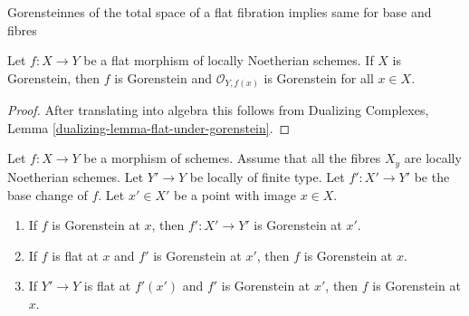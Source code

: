 \begin{lemma}
\label{lemma-flat-morphism-from-gorenstein-scheme}
\begin{slogan}
Gorensteinnes of the total space of a flat fibration implies
same for base and fibres
\end{slogan}
Let $f : X \to Y$ be a flat morphism of locally Noetherian schemes.
If $X$ is Gorenstein, then $f$ is Gorenstein and $\mathcal{O}_{Y, f(x)}$
is Gorenstein for all $x \in X$.
\end{lemma}

\begin{proof}
After translating into algebra this follows from
Dualizing Complexes, Lemma \ref{dualizing-lemma-flat-under-gorenstein}.
\end{proof}

\begin{lemma}
\label{lemma-base-change-gorenstein}
Let $f : X \to Y$ be a morphism of schemes.
Assume that all the fibres $X_y$ are locally Noetherian schemes.
Let $Y' \to Y$ be locally of finite type. Let $f' : X' \to Y'$
be the base change of $f$.
Let $x' \in X'$ be a point with image $x \in X$.
\begin{enumerate}
\item If $f$ is Gorenstein at $x$, then
$f' : X' \to Y'$ is Gorenstein at $x'$.
\item If $f$ is flat at $x$ and $f'$ is Gorenstein at $x'$, then $f$
is Gorenstein at $x$.
\item If $Y' \to Y$ is flat at $f'(x')$ and $f'$ is Gorenstein at
$x'$, then $f$ is Gorenstein at $x$.
\end{enumerate}
\end{lemma}

